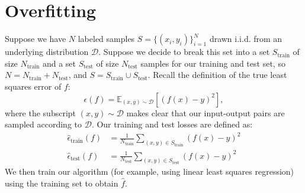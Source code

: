\documentclass{article}
\begin{document}
\section*{Overfitting}
\begin{bprob}
    Suppose we have $N$ labeled samples $S = \{(x_i,y_i)\}_{i=1}^N$ drawn i.i.d. from an underlying distribution $\mathcal{D}$. Suppose we decide to break this set into a set $S_{\textrm{train}}$ of size $N_{\textrm{train}}$ and a set $S_{\textrm{test}}$ of size $N_{\textrm{test}}$ samples for our training and test set, so $N = N_{\textrm{train}} + N_{\textrm{test}}$, and $S = S_{\textrm{train}} \cup S_{\textrm{test}}$.  Recall the definition of the true least squares error of $f$:
    \[
      \epsilon(f) = 
      \mathbb{E}_{(x,y) \sim \mathcal{D}} [ (f(x) -y)^2 ],
    \]
    where the subscript $(x,y) \sim \mathcal{D}$ makes clear that our input-output pairs are sampled according to $\mathcal{D}$. Our training and test losses are defined as:
    \begin{align*}
        \widehat{\epsilon}_{\textrm{train}}(f) &=
        \frac{1}{N _{\textrm{train}}} \sum_{(x,y)\in S_{\textrm{train}}}     (f(x) -y)^2\\
        \widehat{\epsilon}_{\textrm{test}}(f) &=
        \frac{1}{N _{\textrm{test}}} \sum_{(x,y)\in S_{\textrm{test}}}     (f(x) -y)^2  
    \end{align*}
    We then train our algorithm (for example, using linear least squares regression) using the training set to obtain $\widehat{f}$.
    

\end{bprob}
\end{document}
